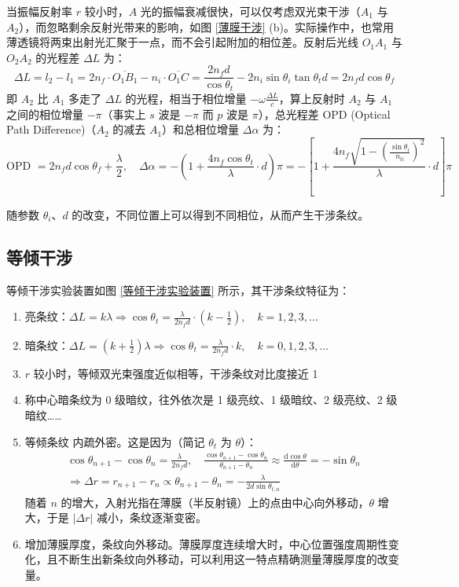 \documentclass[UTF8]{report}
\theoremstyle{MyLineTheoremStyle} %
\theoremstyle{MyBlockTheoremStyle} %
\theoremstyle{MySubsubsectionStyle} %
\begin{document}
当振幅反射率 $r$ 较小时，$A$ 光的振幅衰减很快，可以仅考虑双光束干涉（$A_1$ 与 $A_2$），而忽略剩余反射光带来的影响，如图 \ref{薄膜干涉} (b)。实际操作中，也常用薄透镜将两束出射光汇聚于一点，而不会引起附加的相位差。反射后光线 $O_1A_1$ 与 $O_2A_2$ 的光程差 $\Delta L$ 为：
\begin{equation}
    \Delta L = l_2 - l_1 = 2 n_f\cdot  \overline{O_1B_1} - n_i\cdot  \overline{O_1 C} = \frac{2 n_f d}{\cos \theta_t} - 2 n_i \sin \theta_i \tan \theta_t d = 2 n_f d \cos \theta_f
\end{equation}
即 $A_2$ 比 $A_1$ 多走了 $\Delta L$ 的光程，相当于相位增量 $ - \omega \frac{\Delta L}{c}$，算上反射时 $A_2$ 与 $A_1$ 之间的相位增量 $-\pi$（事实上 $s$ 波是 $-\pi$ 而 $p$ 波是 $\pi$），总光程差 OPD (Optical Path Difference)（$A_2$ 的减去 $A_1$）和总相位增量 $\Delta \alpha$ 为：
\begin{equation}
    \text{OPD\ } = 2 n_f d \cos \theta_f + \frac{\lambda}{2} ,\quad \Delta \alpha 
    = - \left(1 + \frac{4 n_f  \cos \theta_t}{\lambda} \cdot d \right) \pi
    = - \left[ 1 + \frac{4 n_f \sqrt{ 1 - \left(\frac{\sin \theta_i}{n_{ti}} \right)^2 }  }{\lambda} \cdot d \right] \pi
\end{equation}

随参数 $\theta_i$、$d$ 的改变，不同位置上可以得到不同相位，从而产生干涉条纹。

\subsection{等倾干涉}

\noindent 等倾干涉实验装置如图 \ref{等倾干涉实验装置} 所示，其干涉条纹特征为：
\begin{enumerate}
\item 亮条纹：$\Delta L = k \lambda \Longrightarrow \cos \theta_t = \frac{\lambda}{2 n_f d} \cdot (k - \frac{1}{2}),\quad k = 1, 2, 3, ... $
\item 暗条纹：$\Delta L = (k + \frac{1}{2}) \lambda \Longrightarrow \cos \theta_t = \frac{\lambda}{2 n_f d} \cdot k,\quad k = 0, 1, 2, 3, ... $
\item $r$ 较小时，等倾双光束强度近似相等，干涉条纹对比度接近 1
\item 称中心暗条纹为 0 级暗纹，往外依次是 1 级亮纹、1 级暗纹、2 级亮纹、2 级暗纹…… 
\item 等倾条纹{\color{red} 内疏外密}。这是因为（简记 $\theta_t$ 为 $\theta$）：
\begin{gather}
\cos \theta_{n + 1} - \cos \theta_{n} = \frac{\lambda}{2 n_f d},\quad \frac{\cos \theta_{n + 1} - \cos \theta_{n} }{\theta_{n + 1} - \theta_{n}}\approx \frac{\mathrm{d} \cos \theta }{\mathrm{d} \theta } = - \sin \theta_n \\ 
\Longrightarrow \Delta r = r_{n +1} - r_n \propto \theta_{n+1} - \theta_n = - \frac{\lambda}{2d \sin \theta_{t,n}}
\end{gather}
随着 $n$ 的增大，入射光指在薄膜（半反射镜）上的点由中心向外移动，$\theta$ 增大，于是 $| \Delta r |$ 减小，条纹逐渐变密。
\item 增加薄膜厚度，条纹向外移动。薄膜厚度连续增大时，中心位置强度周期性变化，且不断生出新条纹向外移动，可以利用这一特点精确测量薄膜厚度的改变量。
\end{enumerate}
\end{document}
